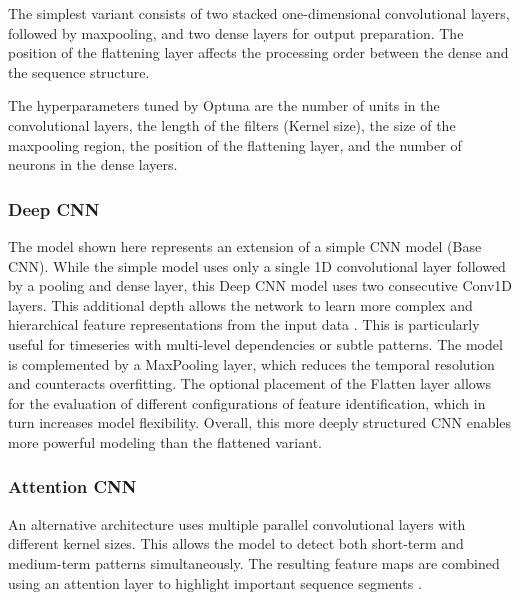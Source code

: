 The simplest variant consists of two stacked one-dimensional convolutional layers, followed by maxpooling, and two dense layers for output preparation.
The position of the flattening layer affects the processing order between the dense and the sequence structure.

The hyperparameters tuned by Optuna are the number of units in the convolutional layers, the length of the filters (Kernel size), the size of the maxpooling region, the position of the flattening layer, and the number of neurons in the dense layers.



\subsubsection{Deep CNN}

The model shown here represents an extension of a simple CNN model (Base CNN).
While the simple model uses only a single 1D convolutional layer followed by a pooling and dense layer, this Deep CNN model uses two consecutive Conv1D layers.
This additional depth allows the network to learn more complex and hierarchical feature representations from the input data \cite{cnn-deep-more-complex}.
This is particularly useful for timeseries with multi-level dependencies or subtle patterns.
The model is complemented by a MaxPooling layer, which reduces the temporal resolution and counteracts overfitting.
The optional placement of the Flatten layer allows for the evaluation of different configurations of feature identification, which in turn increases model flexibility.
Overall, this more deeply structured CNN enables more powerful modeling than the flattened variant.



\subsubsection{Attention CNN}

An alternative architecture uses multiple parallel convolutional layers with different kernel sizes.
This allows the model to detect both short-term and medium-term patterns simultaneously.
The resulting feature maps are combined using an attention layer to highlight important sequence segments \cite{cnn-attention}.

